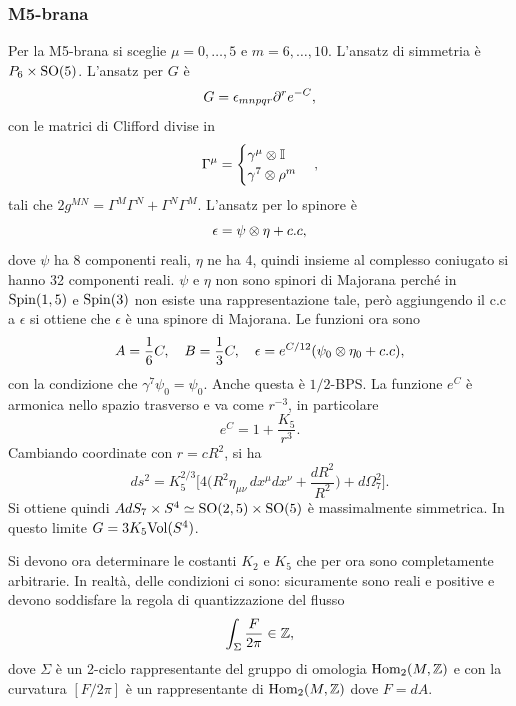 \subsubsection{M5-brana}
Per la M5-brana si sceglie $\mu = 0,\dots,5$ e $m = 6,\dots,10$. L'ansatz di simmetria è $P_6 \times \mathrm{SO}(5)$. L'ansatz per $G$ è 
\begin{equation}
    G = \epsilon_{mnpqr}\partial^re^{-C},
\end{equation}
con le matrici di Clifford divise in 
\begin{equation}
    \Gamma^\mu = 
    \begin{cases}
        \gamma^\mu \otimes \mathbb{I} \\
        \gamma^7 \otimes \rho^m
    \end{cases},
\end{equation}
tali che $2g^{MN} = \Gamma^M\Gamma^N + \Gamma^N\Gamma^M$. L'ansatz per lo spinore è 
\begin{equation}
    \epsilon = \psi \otimes \eta + c.c,
\end{equation}
dove $\psi$ ha 8 componenti reali, $\eta$ ne ha 4, quindi insieme al complesso coniugato si hanno 32 componenti reali. $\psi$ e $\eta$ non sono spinori di Majorana perché in $\mathrm{Spin}(1,5)$ e $\mathrm{Spin}(3)$ non esiste una rappresentazione tale, però aggiungendo il c.c a $\epsilon$ si ottiene che $\epsilon$ è una spinore di Majorana. Le funzioni ora sono 
\begin{equation}
    A = \frac{1}{6}C,\quad B = \frac{1}{3}C,\quad \epsilon = e^{C/12}(\psi_0 \otimes \eta_0 + c.c),
\end{equation}
con la condizione che $\gamma^7\psi_0 = \psi_0$. Anche questa è $1/2$-BPS. La funzione $e^{C}$ è armonica nello spazio trasverso e va come $r^{-3}$, in particolare 
\begin{equation}
    e^{C} = 1 + \frac{K_5}{r^3}.
\end{equation}
Cambiando coordinate con $r = cR^2$, si ha 
\begin{equation}
    ds^2 = K_5^{2/3}\bigg[4\bigg(R^2\eta_{\mu\nu}\,dx^\mu dx^\nu + \frac{dR^2}{R^2}\bigg) + d\Omega_7^2\bigg].
\end{equation}
Si ottiene quindi $AdS_7 \times S^4 \simeq \mathrm{SO}(2,5) \times \mathrm{SO}(5)$ è massimalmente simmetrica. In questo limite $G = 3K_5\mathrm{Vol}(S^4)$. 

Si devono ora determinare le costanti $K_2$ e $K_5$ che per ora sono completamente arbitrarie. In realtà, delle condizioni ci sono: sicuramente sono reali e positive e devono soddisfare la regola di quantizzazione del flusso
\begin{equation}
    \int_\Sigma \frac{F}{2\pi} \in \mathbb{Z},
\end{equation}
dove $\Sigma$ è un 2-ciclo rappresentante del gruppo di omologia $\mathrm{Hom_{2}}(M,\mathbb{Z})$ e con la curvatura $[F/2\pi]$ è un rappresentante di $\mathrm{Hom_{2}}(M,\mathbb{Z})$ dove $F = dA$.

